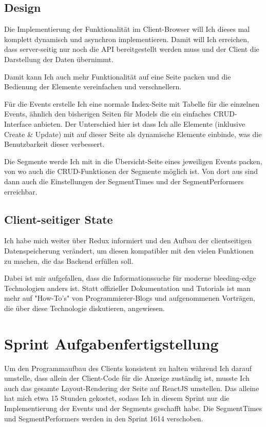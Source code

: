 \documentclass[a4paper,10pt]{scrartcl}
\begin{document}
  \subsection{Design}

    Die Implementierung der Funktionalität im Client-Browser will Ich dieses
    mal komplett dynamisch und asynchron implementieren.
    Damit will Ich erreichen, dass server-seitig nur noch die API bereitgestellt
    werden muss und der Client die Darstellung der Daten übernimmt.

    Damit kann Ich auch mehr Funktionalität auf eine Seite packen und die
    Bedienung der Elemente vereinfachen und verschnellern.

    Für die Events erstelle Ich eine normale Index-Seite mit Tabelle für die
    einzelnen Events, ähnlich den bisherigen Seiten für Models die ein
    einfaches CRUD-Interface anbieten.
    Der Unterschied hier ist dass Ich alle Elemente (inklusive Create & Update)
    mit auf dieser Seite als dynamische Elemente einbinde, was die Benutzbarkeit
    dieser verbessert.

    Die Segmente werde Ich mit in die Übersicht-Seite eines jeweiligen Events
    packen, von wo auch die CRUD-Funktionen der Segmente möglich ist.
    Von dort aus sind dann auch die Einstellungen der SegmentTimes und der
    SegmentPerformers erreichbar.

  \subsection{Client-seitiger State}

    Ich habe mich weiter über Redux informiert und den Aufbau der clientseitigen
    Datenspeicherung verändert, um diesen kompatibler mit den vielen Funktionen
    zu machen, die das Backend erfüllen soll.

    Dabei ist mir aufgefallen, dass die Informationssuche für moderne
    bleeding-edge Technologien anders ist.
    Statt offizieller Dokumentation und Tutorials ist man mehr auf "How-To's"
    von Programmierer-Blogs und aufgenommenen Vorträgen, die über diese
    Technologie diskutieren, angewiesen.

\section{Sprint Aufgabenfertigstellung}

  Um den Programmaufbau des Clients konsistent zu halten während Ich darauf
  umstelle, dass allein der Client-Code für die Anzeige zuständig ist, musste
  Ich auch das gesamte Layout-Rendering der Seite auf ReactJS umstellen.
  Das alleine hat mich etwa 15 Stunden gekostet, sodass Ich in diesem Sprint
  nur die Implementierung der Events und der Segments geschafft habe.
  Die SegmentTimes und SegmentPerformers werden in den Sprint 1614 verschoben.
\end{document}
